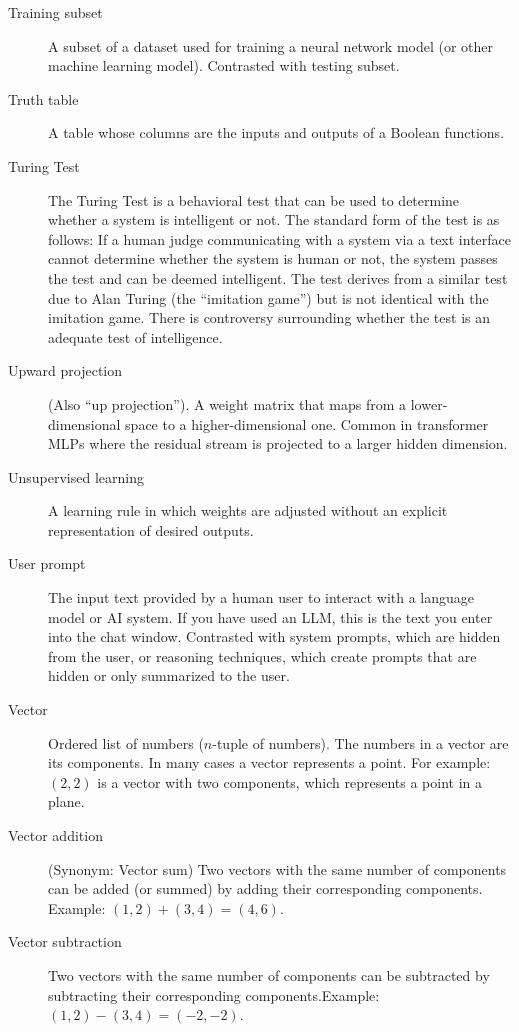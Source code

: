 \begin{description}
\item[Training subset] A subset of a dataset used for training a neural network model (or other machine learning model). Contrasted with testing subset.

\item[Truth table] A table whose columns are the inputs and outputs of a Boolean functions.

\item[Turing Test] The Turing Test is a behavioral test that can be used to determine whether a system is intelligent or not. The standard form of the test is as follows: If a human judge communicating with a system via a text interface cannot determine whether the system is human or not, the system passes the test and can be deemed intelligent.  The test derives from a similar test due to Alan Turing (the ``imitation game'') but is not identical with the imitation game. There is controversy surrounding whether the test is an adequate test of intelligence.

\item[Upward projection] (Also ``up projection''). A weight matrix that maps from a lower-dimensional space to a higher-dimensional one. Common in transformer MLPs where the residual stream is projected to a larger hidden dimension.

\item[Unsupervised learning] A learning rule in which weights are adjusted without an explicit representation of desired outputs.

\item[User prompt] The input text provided by a human user to interact with a language model or AI system. If you have used an LLM, this is the text you enter into the chat window. Contrasted with system prompts, which are hidden from the user, or reasoning techniques, which create prompts that are hidden or only summarized to the user.

\item[Vector] Ordered list of numbers ($n$-tuple of numbers). The numbers in a vector are its components. In many cases a vector represents a point. For example: $(2,2)$ is a vector with two components, which represents a point in a plane.

\item[Vector addition] (Synonym: Vector sum) Two vectors with the same number of components can be added (or summed) by adding their corresponding components. Example: $(1,2) + (3,4) = (4,6)$.

\item[Vector subtraction] Two vectors with the same number of components can be subtracted by subtracting their corresponding components.Example: $(1,2) - (3,4) = (-2,-2)$.


\end{description}
